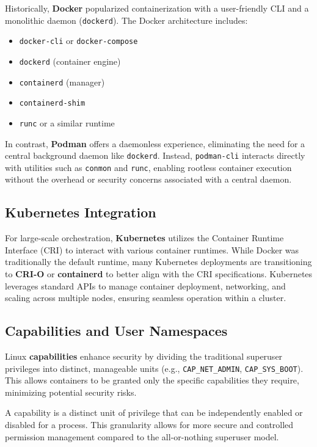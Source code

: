 Historically, \textbf{Docker} popularized containerization with a user-friendly CLI and a monolithic daemon (\texttt{dockerd}). The Docker architecture includes:
\begin{itemize}
    \item \texttt{docker-cli} or \texttt{docker-compose}
    \item \texttt{dockerd} (container engine)
    \item \texttt{containerd} (manager)
    \item \texttt{containerd-shim}
    \item \texttt{runc} or a similar runtime
\end{itemize}

In contrast, \textbf{Podman} offers a daemonless experience, eliminating the need for a central background daemon like \texttt{dockerd}. Instead, \texttt{podman-cli} interacts directly with utilities such as \texttt{conmon} and \texttt{runc}, enabling rootless container execution without the overhead or security concerns associated with a central daemon.

\subsection{Kubernetes Integration}

For large-scale orchestration, \textbf{Kubernetes} utilizes the Container Runtime Interface (CRI) to interact with various container runtimes. While Docker was traditionally the default runtime, many Kubernetes deployments are transitioning to \textbf{CRI-O} or \textbf{containerd} to better align with the CRI specifications. Kubernetes leverages standard APIs to manage container deployment, networking, and scaling across multiple nodes, ensuring seamless operation within a cluster.

\subsection{Capabilities and User Namespaces}

Linux \textbf{capabilities} enhance security by dividing the traditional superuser privileges into distinct, manageable units (e.g., \texttt{CAP\_NET\_ADMIN}, \texttt{CAP\_SYS\_BOOT}). This allows containers to be granted only the specific capabilities they require, minimizing potential security risks.

\begin{definitionblock}[Capability]
A capability is a distinct unit of privilege that can be independently enabled or disabled for a process. This granularity allows for more secure and controlled permission management compared to the all-or-nothing superuser model.
\end{definitionblock}

